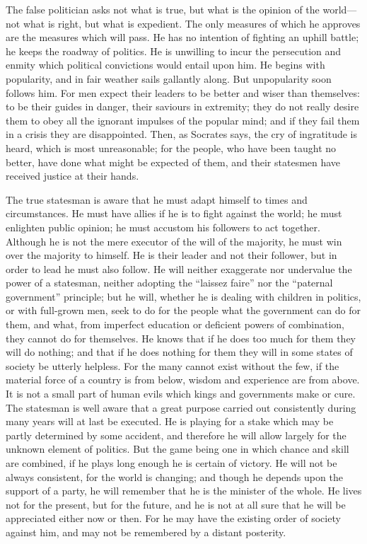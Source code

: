 \documentclass[11pt,letter]{article}
\begin{document}
\par  The false politician asks not what is true, but what is the opinion of the world—not what is right, but what is expedient. The only measures of which he approves are the measures which will pass. He has no intention of fighting an uphill battle; he keeps the roadway of politics. He is unwilling to incur the persecution and enmity which political convictions would entail upon him. He begins with popularity, and in fair weather sails gallantly along. But unpopularity soon follows him. For men expect their leaders to be better and wiser than themselves: to be their guides in danger, their saviours in extremity; they do not really desire them to obey all the ignorant impulses of the popular mind; and if they fail them in a crisis they are disappointed. Then, as Socrates says, the cry of ingratitude is heard, which is most unreasonable; for the people, who have been taught no better, have done what might be expected of them, and their statesmen have received justice at their hands.

\par  The true statesman is aware that he must adapt himself to times and circumstances. He must have allies if he is to fight against the world; he must enlighten public opinion; he must accustom his followers to act together. Although he is not the mere executor of the will of the majority, he must win over the majority to himself. He is their leader and not their follower, but in order to lead he must also follow. He will neither exaggerate nor undervalue the power of a statesman, neither adopting the “laissez faire” nor the “paternal government” principle; but he will, whether he is dealing with children in politics, or with full-grown men, seek to do for the people what the government can do for them, and what, from imperfect education or deficient powers of combination, they cannot do for themselves. He knows that if he does too much for them they will do nothing; and that if he does nothing for them they will in some states of society be utterly helpless. For the many cannot exist without the few, if the material force of a country is from below, wisdom and experience are from above. It is not a small part of human evils which kings and governments make or cure. The statesman is well aware that a great purpose carried out consistently during many years will at last be executed. He is playing for a stake which may be partly determined by some accident, and therefore he will allow largely for the unknown element of politics. But the game being one in which chance and skill are combined, if he plays long enough he is certain of victory. He will not be always consistent, for the world is changing; and though he depends upon the support of a party, he will remember that he is the minister of the whole. He lives not for the present, but for the future, and he is not at all sure that he will be appreciated either now or then. For he may have the existing order of society against him, and may not be remembered by a distant posterity.
\end{document}
